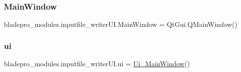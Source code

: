 \subsubsection{\texorpdfstring{Main\+Window}{MainWindow}}
{\footnotesize\ttfamily bladepro\+\_\+modules.\+inputfile\+\_\+writer\+U\+I.\+Main\+Window = Qt\+Gui.\+Q\+Main\+Window()}

\hypertarget{a00049_ad10cb13360f604c82c202259b73f747b}{}\label{a00049_ad10cb13360f604c82c202259b73f747b} 
\subsubsection{\texorpdfstring{ui}{ui}}
{\footnotesize\ttfamily bladepro\+\_\+modules.\+inputfile\+\_\+writer\+U\+I.\+ui = \hyperlink{a00074}{Ui\+\_\+\+Main\+Window}()}

